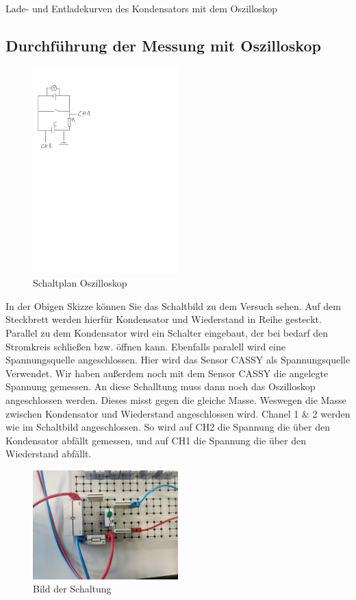 \documentclass[twoside]{protokoll}
\begin{document}
\begin{aufgabe}{Lade- und Entladekurven des Kondensators mit dem Oszilloskop}
  \subsection{Durchführung der Messung mit Oszilloskop}  
  
  \begin{figure}[H]
  \centering
  \includegraphics[width=0.5\textwidth]{schaltzkisse-osziloskop.pdf}
  \caption{Schaltplan Oszilloskop}
  \centering
  \end{figure}

  In der Obigen Skizze können Sie das Schaltbild zu dem Versuch sehen. 
  Auf dem Steckbrett werden hierfür Kondensator und Wiederstand in Reihe gesteckt.
  Parallel zu dem Kondensator wird ein Schalter eingebaut, der bei bedarf den Stromkreis
  schließen bzw. öffnen kann. Ebenfalls paralell wird eine Spannungsquelle angeschlossen. 
  Hier wird das Sensor CASSY als Spannungsquelle Verwendet. Wir haben außerdem noch mit dem
  Sensor CASSY die angelegte Spannung gemessen. An diese Schalltung muss dann noch das 
  Oszilloskop angeschlossen werden. Dieses misst gegen die gleiche Masse. Weswegen die Masse
  zwischen Kondensator und Wiederstand angeschlossen wird. Chanel 1 \& 2 werden wie im Schaltbild angeschlossen.
   So wird auf CH2 die Spannung die über den Kondensator abfällt gemessen, und 
  auf CH1 die Spannung die über den Wiederstand abfällt. 

  \begin{figure}[H]
  \centering
  \includegraphics[width=0.5\textwidth]{Bilder_Osziloskop/Schaltung_Osziloskop_02.pdf}
  \caption{Bild der Schaltung}
  \centering
  \end{figure}
 

\end{aufgabe}
\end{document}
